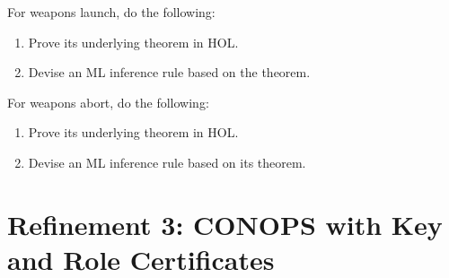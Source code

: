 \begin{exercise}[\synthesis]
  For weapons launch, do the following:
  \begin{enumerate}[{A.}]
  \item Prove its underlying theorem in HOL.
  \item Devise an ML inference rule based on the theorem.
  \end{enumerate}
\end{exercise}

\begin{exercise}[\synthesis]
  For weapons abort, do the following:
  \begin{enumerate}[{A.}]
  \item Prove its underlying theorem in HOL.
  \item Devise an ML inference rule based on its theorem.
  \end{enumerate}
\end{exercise}


\section{Refinement 3: CONOPS with Key and Role Certificates}
\label{sec:refinement3}

